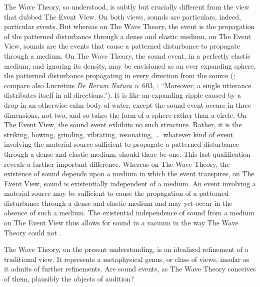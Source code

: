 The Wave Theory, so understood, is subtly but crucially different from the view that \citet{OCallaghan:2007xy} dubbed The Event View. On both views, sounds are particulars, indeed, particular events. But whereas on The Wave Theory, the event is the propagation of the patterned disturbance through a dense and elastic medium, on The Event View, sounds are the events that cause a patterned disturbance to propagate through a medium. On The Wave Theory, the sound event, in a perfectly elastic medium, and ignoring its density, may be envisioned as an ever expanding sphere, the patterned disturbance propagating in every direction from the source (\citealt{Sorensen:2009aa}; compare also Lucretius \emph{De Rerum Natura} \textsc{iv} 603, \citealt{Smith:2001aa}: ``Moreover, a single utterance distributes itself in all directions.''). It is like an expanding ripple caused by a drop in an otherwise calm body of water, except the sound event occurs in three dimensions, not two, and so takes the form of a sphere rather than a circle. On The Event View, the sound event exhibits no such structure. Rather, it is the striking, bowing, grinding, vibrating, resonating, \ldots\ whatever kind of event involving the material source sufficient to propagate a patterned disturbance through a dense and elastic medium, should there be one. This last qualification reveals a further important difference. Whereas on The Wave Theory, the existence of sound depends upon a medium in which the event transpires, on The Event View, sound is existentially independent of a medium. An event involving a material source may be sufficient to cause the propagation of a patterned disturbance through a dense and elastic medium and may yet occur in the absence of such a medium. The existential independence of sound from a medium on The Event View thus allows for sound in a vacuum in the way The Wave Theory could not \citep{OCallaghan:2007xy,OCallaghan:2009aa}.

The Wave Theory, on the present understanding, is an idealized refinement of a traditional view. It represents a metaphysical genus, or class of views, insofar as it admits of further refinements. Are sound events, as The Wave Theory conceives of them, plausibly the objects of audition?

